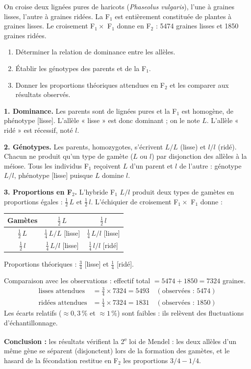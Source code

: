 \documentclass[11pt]{article}
\newcommand{\cle}[1]{{\popxbold\color{popdark}#1}}
\begin{document}
\begin{exoresolu}
On croise deux lignées pures de haricots (\emph{Phaseolus vulgaris}), l'une à graines lisses, l'autre à graines ridées. La F$_1$ est entièrement constituée de plantes à graines lisses. Le croisement F$_1 \times$ F$_1$ donne en F$_2$ : 5474 graines lisses et 1850 graines ridées.
\begin{enumerate}
\item Déterminer la relation de dominance entre les allèles.
\item Établir les génotypes des parents et de la F$_1$.
\item Donner les proportions théoriques attendues en F$_2$ et les comparer aux résultats observés.
\end{enumerate}
\tcblower
\textbf{1. Dominance.} Les parents sont de lignées pures et la F$_1$ est homogène, de phénotype [lisse]. L'allèle « lisse » est donc \cle{dominant} ; on le note $L$. L'allèle « ridé » est récessif, noté $l$.

\textbf{2. Génotypes.} Les parents, homozygotes, s'écrivent $L/L$ (lisse) et $l/l$ (ridé). Chacun ne produit qu'un type de gamète ($L$ ou $l$) par disjonction des allèles à la méiose. Tous les individus F$_1$ reçoivent $L$ d'un parent et $l$ de l'autre : génotype $L/l$, phénotype [lisse] puisque $L$ domine $l$.

\textbf{3. Proportions en F$_2$.} L'hybride F$_1$ $L/l$ produit deux types de gamètes en proportions égales : $\frac{1}{2}\,L$ et $\frac{1}{2}\,l$. L'échiquier de croisement F$_1 \times$ F$_1$ donne :
\begin{center}
\begin{tabular}{|c|c|c|}
\hline
\rowcolor{popblueL} Gamètes & $\frac{1}{2}\,L$ & $\frac{1}{2}\,l$ \\
\hline
$\frac{1}{2}\,L$ & $\frac{1}{4}\,L/L$ [lisse] & $\frac{1}{4}\,L/l$ [lisse] \\
\hline
$\frac{1}{2}\,l$ & $\frac{1}{4}\,L/l$ [lisse] & $\frac{1}{4}\,l/l$ [ridé] \\
\hline
\end{tabular}
\end{center}
Proportions théoriques : $\frac{3}{4}$ [lisse] et $\frac{1}{4}$ [ridé].

Comparaison avec les observations : effectif total $= 5474 + 1850 = 7324$ graines.
\begin{align*}
\text{lisses attendues} &= \tfrac{3}{4} \times 7324 = 5493 \quad (\text{observées : } 5474)\\
\text{ridées attendues} &= \tfrac{1}{4} \times 7324 = 1831 \quad (\text{observées : } 1850)
\end{align*}
Les écarts relatifs ($\approx 0{,}3\,\%$ et $\approx 1\,\%$) sont faibles : ils relèvent des fluctuations d'échantillonnage.

\textbf{Conclusion :} les résultats vérifient la 2\textsuperscript{e} loi de Mendel : les deux allèles d'un même gène se séparent (disjonctent) lors de la formation des gamètes, et le hasard de la fécondation restitue en F$_2$ les proportions $3/4 - 1/4$.
\end{exoresolu}
\end{document}
